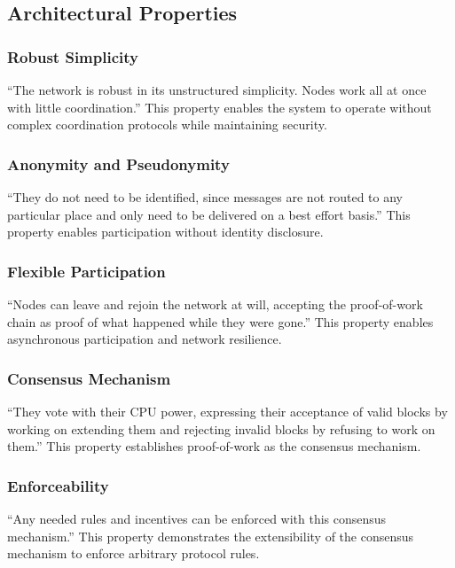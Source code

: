\subsection{Architectural Properties}
\label{subsec:arch-properties}

\subsubsection{Robust Simplicity}

``The network is robust in its unstructured simplicity. Nodes work all at once with little coordination.'' This property enables the system to operate without complex coordination protocols while maintaining security.

\subsubsection{Anonymity and Pseudonymity}

``They do not need to be identified, since messages are not routed to any particular place and only need to be delivered on a best effort basis.'' This property enables participation without identity disclosure.

\subsubsection{Flexible Participation}

``Nodes can leave and rejoin the network at will, accepting the proof-of-work chain as proof of what happened while they were gone.'' This property enables asynchronous participation and network resilience.

\subsubsection{Consensus Mechanism}

``They vote with their CPU power, expressing their acceptance of valid blocks by working on extending them and rejecting invalid blocks by refusing to work on them.'' This property establishes proof-of-work as the consensus mechanism.

\subsubsection{Enforceability}

``Any needed rules and incentives can be enforced with this consensus mechanism.'' This property demonstrates the extensibility of the consensus mechanism to enforce arbitrary protocol rules.

